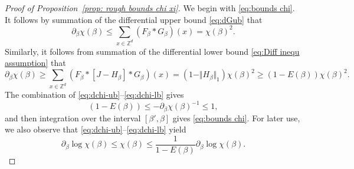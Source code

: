 \documentclass[11pt,a4paper]{article}
\numberwithin{equation}{section}
\theoremstyle{plain}
\theoremstyle{definition}
\newcommand\1{\mathds{1}}
\begin{document}
\begin{proof}[Proof of Proposition~\textup{\ref{prop: rough bounds chi xi}}]
We begin with \eqref{eq:bounds chi}.
It follows by summation of the differential upper bound \eqref{eq:dGub} that
\begin{equation}
\label{eq:dchi-ub}
	\partial_\beta \chi(\beta)\leq \sum_{x\in \mathbb Z^d}(F_\beta*G_\beta)(x)=\chi(\beta)^2.
\end{equation}
Similarly, it follows from summation of the differential lower bound \eqref{eq:Diff inequ assumption} that
\begin{equation}
\label{eq:dchi-lb}
	\partial_\beta \chi(\beta)
    \geq \sum_{x\in \mathbb Z^d}(F_\beta*[J-H_\beta]*G_\beta)(x)
    =\left(1- \Vert H_\beta \Vert_1 \right)\chi(\beta)^2
    \geq (1-E(\beta))\chi(\beta)^2.
\end{equation}
The combination of \eqref{eq:dchi-ub}--\eqref{eq:dchi-lb} gives
\begin{equation}\label{eq:proof basic prop0}
	(1-E(\beta))\leq -\partial_\beta\chi(\beta)^{-1} \leq 1,
\end{equation}
and then integration over the interval $[\beta',\beta]$ gives \eqref{eq:bounds chi}.
For later use, we also observe that \eqref{eq:dchi-ub}--\eqref{eq:dchi-lb} yield
\begin{equation}
\label{eq:bounds log der}
	\partial_\beta\log\chi(\beta)\leq \chi(\beta)\leq \frac{1}{1-E(\beta)}\partial_\beta\log\chi(\beta).
\end{equation}


\end{proof}
\end{document}
